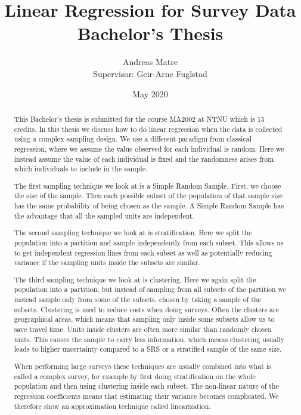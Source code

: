 \documentclass{article}
\title{\textbf{Linear Regression for Survey Data} \\
{\Large Bachelor's Thesis}}
\author{Andreas Matre \\
Supervisor: Geir-Arne Fuglstad}
\date{May 2020}
\begin{document}
\newtheorem{definition}{Definition}
\newtheorem{theorem}{Theorem}
\newtheorem{example}{Example}


\maketitle

\begin{abstract}
  This Bachelor's thesis is submitted for the course MA2002 at NTNU which is 15 credits.
  In this thesis we discuss how to do linear regression when the data is
  collected using a
  complex sampling design. We use a different paradigm from classical
  regression, where we assume the value observed for each individual is random. Here
  we instead assume the value of each individual is fixed and the randomness
  arises from which individuals to include in the sample.

  The first sampling technique we look at is a Simple Random Sample. First, we
  choose the size of the sample. Then each possible subset of
  the population of that sample size has the same probability of being chosen as
  the sample. A Simple Random Sample has the advantage that all the sampled
  units are independent.

  The second sampling technique we look at is stratification. Here we split the
  population into a partition and sample independently from each subset. This
  allows us to get independent regression lines from each subset as well as
  potentially reducing variance if the sampling units inside the subsets are
  similar.

  The third sampling technique we look at is clustering. Here we again split
  the population into a partition, but instead of sampling from all subsets of
  the partition we instead sample only from some of the subsets, chosen by
  taking a sample of the subsets. Clustering is used
  to reduce costs when doing surveys. Often the clusters are geographical areas,
  which means that sampling only inside some subsets allow us to save 
  travel time. Units inside clusters are often more similar than randomly chosen
  units. This causes the sample to carry less information, which
  means clustering usually leads to higher uncertainty compared to a SRS or a
  stratified sample of the same size.

  When performing large surveys these techniques are usually combined into what
  is called a complex survey, for example by first doing stratification on the
  whole population and then using clustering inside each subset. The non-linear
  nature of the regression coefficients means that estimating their variance
  becomes complicated. We therefore show an approximation technique called linearization.
\end{abstract}
\end{document}
